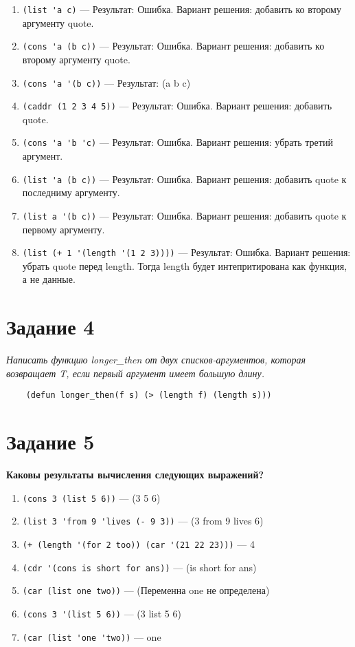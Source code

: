 \documentclass[a4paper,14pt, unknownkeysallowed]{extreport}
\begin{document}
\begin{enumerate}[label=\arabic*)]
	\item \lstinline {(list 'a c)} --- 
	Результат: Ошибка. 
	Вариант решения: добавить ко второму аргументу quote.
	\item \lstinline {(cons 'a (b c))} --- 
	Результат: Ошибка. 
	Вариант решения: добавить ко второму аргументу quote.
	\item \lstinline {(cons 'a '(b c))} --- 
	Результат: (a b c) 
	\item \lstinline {(caddr (1 2 3 4 5))} --- 
	Результат: Ошибка. 
	Вариант решения: добавить quote.
	\item \lstinline {(cons 'a 'b 'c)} --- 
	Результат: Ошибка. 
	Вариант решения: убрать третий аргумент.
	\item \lstinline {(list 'a (b c))} --- 
	Результат: Ошибка. 
	Вариант решения: добавить quote к последниму аргументу.
	\item \lstinline {(list a '(b c))}  --- 
	Результат: Ошибка. 
	Вариант решения: добавить quote к первому аргументу.
	\item \lstinline {(list (+ 1 '(length '(1 2 3))))}  --- 
	Результат: Ошибка. 
	Вариант решения: убрать quote перед length. Тогда length будет интепритирована как функция, а не данные.
	
\end{enumerate}

\section*{Задание 4}

\textit{Написать функцию longer\_then от двух списков-аргументов, 
	которая возвращает T, если первый аргумент имеет большую длину.}


\begin{lstlisting}
	(defun longer_then(f s) (> (length f) (length s)))
\end{lstlisting}


\section*{Задание 5}

\textbf{Каковы результаты вычисления следующих выражений?}

\begin{enumerate}[label=\arabic*)]
	\item \lstinline {(cons 3 (list 5 6))} --- (3 5 6)
	\item \lstinline {(list 3 'from 9 'lives (- 9 3))} --- (3 from 9 lives 6)
	\item \lstinline {(+ (length '(for 2 too)) (car '(21 22 23)))} --- 4
	\item \lstinline {(cdr '(cons is short for ans))} --- (is short for ans)
	\item \lstinline {(car (list one two))} --- (Переменна one не определена)
	\item \lstinline {(cons 3 '(list 5 6))} --- (3 list 5 6)
	\item \lstinline {(car (list 'one 'two))} --- one
\end{enumerate}
\end{document}
